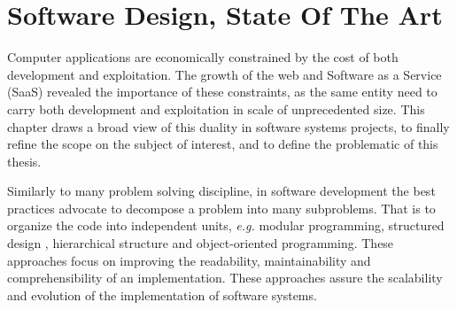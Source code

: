 \chapter{Software Design, State Of The Art} \label{chapter3}
\minitoc
\eject

Computer applications are economically constrained by the cost of both development and exploitation.
The growth of the web and Software as a Service (SaaS) revealed the importance of these constraints, as the same entity need to carry both development and exploitation in scale of unprecedented size.
This chapter draws a broad view of this duality in software systems projects, to finally refine the scope on the subject of interest, and to define the problematic of this thesis.

Similarly to many problem solving discipline, in software development the best practices advocate to decompose a problem into many subproblems.
That is to organize the code into independent units, \textit{e.g.} modular programming, structured design \cite{Stevens1974}, hierarchical structure \cite{Dijkstra1968} and object-oriented programming.
These approaches focus on improving the readability, maintainability and comprehensibility of an implementation.
These approaches assure the scalability and evolution of the implementation of software systems.

